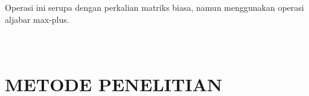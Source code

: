 \documentclass[12pt]{article}
\numberwithin{lemma}{subsection}
\begin{document}
Operasi ini serupa dengan perkalian matriks biasa, namun menggunakan operasi aljabar max-plus.


\pagebreak
\section{\\METODE PENELITIAN}
\pagebreak
\end{document}
